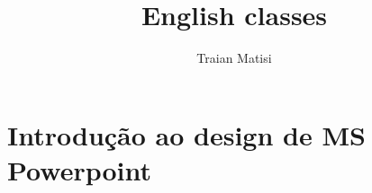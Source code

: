 \documentclass[12pt,a4paper]{article} %
\title{English classes}
\author{Traian Matisi}
\begin{document}
	\maketitle
	\section{Introdução ao design de MS Powerpoint}
	
\end{document}
